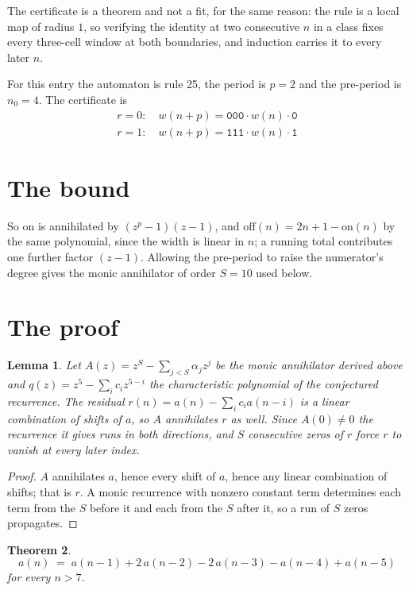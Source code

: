 \documentclass[11pt,a4paper]{article}
\theoremstyle{plain}
\newtheorem{theorem}{Theorem}
\newtheorem{lemma}[theorem]{Lemma}
\theoremstyle{definition}
\begin{document}
The certificate is a theorem and not a fit, for the same reason: the rule is a local map of
radius $1$, so verifying the identity at two consecutive $n$ in a class fixes every three-cell
window at both boundaries, and induction carries it to every later $n$.

For this entry the automaton is rule 25, the period is $p=2$ and the pre-period is $n_0=4$.
The certificate is
\begin{gather*}
r=0:\quad w(n+p) = \texttt{000} \cdot w(n) \cdot \texttt{0} \\
r=1:\quad w(n+p) = \texttt{111} \cdot w(n) \cdot \texttt{1}
\end{gather*}

\section{The bound}

So
$\mathrm{on}$ is annihilated by $(z^p-1)(z-1)$, and $\mathrm{off}(n)=2n+1-\mathrm{on}(n)$ by
the same polynomial, since the width is linear in $n$; a running total contributes one further
factor $(z-1)$. Allowing the pre-period to raise the numerator's degree gives the monic
annihilator of order $S=10$ used below.

\section{The proof}

\begin{lemma}\label{lem:crit}
Let $A(z)=z^S-\sum_{j<S}\alpha_jz^{j}$ be the monic annihilator derived above and
$q(z)=z^{5}-\sum_ic_iz^{5-i}$ the characteristic polynomial of the conjectured
recurrence. The residual $r(n)=a(n)-\sum_ic_ia(n-i)$ is a linear combination of shifts of $a$,
so $A$ annihilates $r$ as well. Since $A(0)\ne0$ the recurrence it gives runs in both
directions, and $S$ consecutive zeros of $r$ force $r$ to vanish at every later index.
\end{lemma}

\begin{proof}
$A$ annihilates $a$, hence every shift of $a$, hence any linear combination of shifts; that is
$r$. A monic recurrence with nonzero constant term determines each term from the $S$ before it
and each from the $S$ after it, so a run of $S$ zeros propagates.
\end{proof}

\begin{theorem}
\[
a(n)\;=\;a(n-1) + 2\,a(n-2) - 2\,a(n-3) - a(n-4) + a(n-5)
\]
for every $n>7$.
\end{theorem}
\end{document}
